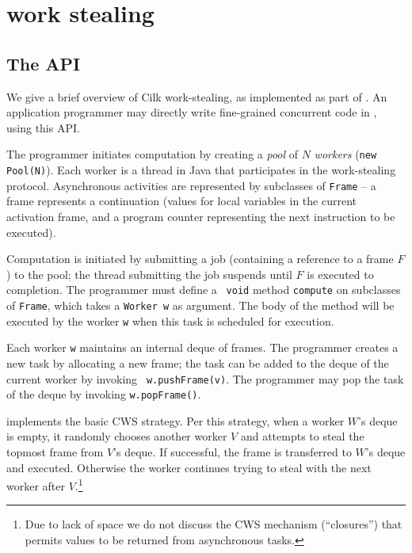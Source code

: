 \section{\Xten{} work stealing}\label{sec:XWS}
\subsection{The \CWS{} API}

We give a brief overview of Cilk work-stealing, as implemented as part of \XWS.
An application programmer may directly write fine-grained concurrent
code in \Java, using this API.

The programmer initiates computation by creating a {\em pool} of $N$
{\em workers} ({\tt new Pool(N)}). Each worker is a thread in Java
that participates in the \XWS{} work-stealing protocol.  Asynchronous
activities are represented by subclasses of {\tt Frame} -- a frame represents
a continuation (values for local variables in the current activation frame, and a 
program counter representing the next instruction to be executed). 

Computation is initiated by submitting a job (containing a reference
to a frame $F$) to the pool; the thread submitting the job suspends
until $F$ is executed to completion. The programmer must define a {\tt
void} method {\tt compute} on subclasses of {\tt Frame}, which takes a
{\tt Worker w} as argument. The body of the method will be executed by
the worker {\tt w} when this task is scheduled for execution.

Each worker {\tt w} maintains an internal deque of frames. The
programmer creates a new task by allocating a new frame; the task can
be added to the deque of the current worker by invoking {\tt
w.pushFrame(v)}. The programmer may pop the task of the deque by
invoking {\tt w.popFrame()}.

\XWS{} implements the basic CWS strategy. Per this strategy, when a
worker $W$'s deque is empty, it randomly chooses another worker $V$
and attempts to steal the topmost frame from $V$'s deque. If
successful, the frame is transferred to $W$'s deque and
executed. Otherwise the worker continues trying to steal with the next
worker after $V$.\footnote{Due to lack of space we do not discuss the
CWS mechanism (``closures'') that permits values to be returned from
asynchronous tasks.}


